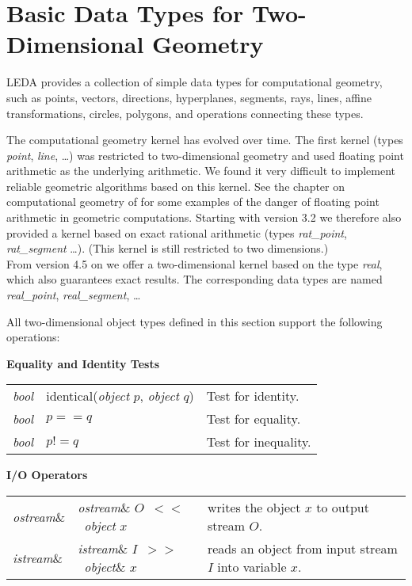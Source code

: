 \chapter{Basic Data Types for Two-Dimensional Geometry}
\label{Basic Data Types for Two-Dimensional Geometry}

LEDA provides a collection of simple data types for computational geometry,
such as points, vectors, directions, hyperplanes, segments, rays, lines, affine
transformations, circles, polygons, and operations connecting these types.

The computational geometry kernel has evolved over time. The first kernel
(types {\it point}, {\it line}, \ldots) was restricted to two-dimensional
geometry and used floating point arithmetic as the underlying arithmetic. We
found it very difficult to implement reliable geometric algorithms based on
this kernel. See the chapter on computational geometry of \cite{LEDAbook} for
some examples of the danger of floating point arithmetic in geometric
computations. Starting with version 3.2 we therefore also provided a kernel
based on exact rational arithmetic (types
{\it rat\_point}, {\it rat\_segment} \ldots). 
(This kernel is still restricted to two dimensions.)\\
From version 4.5 on we offer a two-dimensional kernel based on the type 
{\it real}, which also guarantees exact results. The corresponding data types
are named {\it real\_point}, {\it real\_segment}, \ldots


All two-dimensional object types defined in this section support the following
operations:


{\bf Equality and Identity Tests}\\

\begin{tabular}{lll}
{\it bool} & identical({\it object} $p$, {\it object} $q$) & Test for identity.\\
{\it bool} & $p == q$ & Test for equality.\\
{\it bool} & $p != q$ & Test for inequality.
\end{tabular}


{\bf I/O Operators}\\

\begin{tabular}{lll}
{\it ostream}\& & {\it ostream}\& $O$\ $<<$\ {\it object} $x$ & 
writes the object $x$ to output stream $O$.\\
{\it istream}\& & {\it istream}\& $I$\ $>>$\ {\it object}\& $x$ & 
reads an object from input stream $I$ into variable $x$.
\end{tabular}

